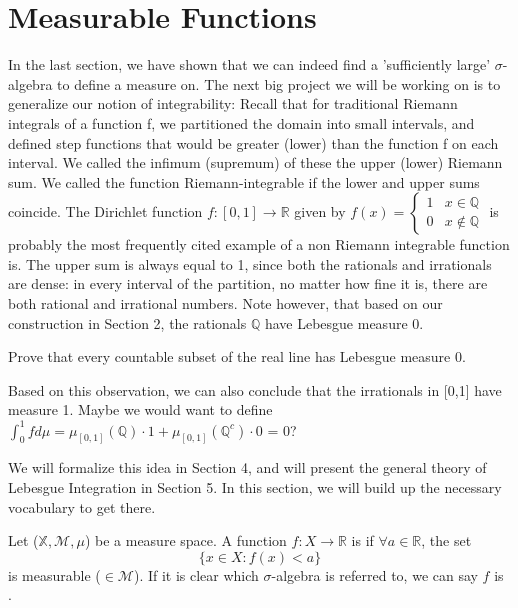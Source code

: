 \documentclass[11pt]{scrartcl}
\begin{document}
\section{Measurable Functions}
In the last section, we have shown that we can indeed find a 'sufficiently large' $\sigma$-algebra to define a measure on. 
The next big project we will be working on is to generalize our notion of integrability: Recall that for traditional Riemann integrals of a function f, we partitioned the domain into small intervals, and defined step functions that would be greater (lower) than the function f on each interval. We called the infimum (supremum) of these the upper (lower) Riemann sum. We called the function Riemann-integrable if the lower and upper sums coincide. 
The Dirichlet function $f: [0,1] \rightarrow \mathbb{R}$ given by
$f(x) = \begin{cases}
1 & x \in \mathbb{Q} \\
0 & x \notin \mathbb{Q} 
\end{cases}$ is probably the most frequently cited example of a non Riemann integrable function is. The upper sum is always equal to 1, since both the rationals and irrationals are dense: in every interval of the partition, no matter how fine it is, there are both rational and irrational numbers.
Note however, that based on our construction in Section 2, the rationals $\mathbb{Q}$ have Lebesgue measure 0. 

\begin{exercise}
Prove that every countable subset of the real line has Lebesgue measure 0.
\end{exercise}

Based on this observation, we can also conclude that the irrationals in [0,1] have measure 1. Maybe we would want to define $\int_0^1 f d\mu = \mu_{[0,1]}(\mathbb{Q}) \cdot 1 + \mu_{[0,1]}(\mathbb{Q}^c) \cdot 0$ = 0? 

We will formalize this idea in Section 4, and will present the general theory of Lebesgue Integration in Section 5. In this section, we will build up the necessary vocabulary to get there.

\begin{definition}
Let ($\mathbb{X},\mathcal{M},\mu$) be a measure space. A function $f : X \rightarrow \mathbb{R}$ is  if $\forall a \in \mathbb{R}$, the set 
\begin{equation}
\{x\in X : f(x) < a\}\tag{*}
\end{equation}
is measurable ($\in \mathcal{M}$). If it is clear which $\sigma$-algebra is referred to, we can say $f$ is .
\end{definition}
\end{document}
